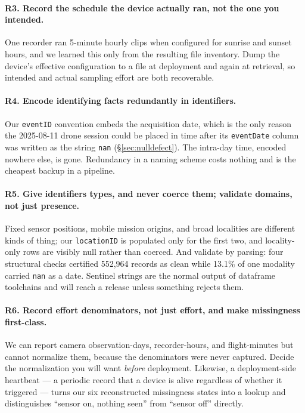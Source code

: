\documentclass[sigconf]{acmart}
\begin{document}
\paragraph{R3. Record the schedule the device actually ran, not the one
you intended.}
One recorder ran 5-minute hourly clips when configured for sunrise and
sunset hours, and we learned this only from the resulting file
inventory. Dump the device's effective configuration to a file at
deployment and again at retrieval, so intended and actual sampling
effort are both recoverable.

\paragraph{R4. Encode identifying facts redundantly in identifiers.}
Our \texttt{eventID} convention embeds the acquisition date, which is
the only reason the 2025-08-11 drone session could be placed in time
after its \texttt{eventDate} column was written as the string
\texttt{nan} (\S\ref{sec:nulldefect}). The intra-day time, encoded
nowhere else, is gone. Redundancy in a naming scheme costs nothing and
is the cheapest backup in a pipeline.

\paragraph{R5. Give identifiers types, and never coerce them; validate
domains, not just presence.}
Fixed sensor positions, mobile mission origins, and broad localities are
different kinds of thing; our \texttt{locationID} is populated only for
the first two, and locality-only rows are visibly null rather than
coerced. And validate by parsing: four structural checks certified
552{,}964 records as clean while 13.1\% of one modality carried
\texttt{nan} as a date. Sentinel strings are the normal output of
dataframe toolchains and will reach a release unless something rejects
them.

\paragraph{R6. Record effort denominators, not just effort, and make
missingness first-class.}
We can report camera observation-days, recorder-hours, and
flight-minutes but cannot normalize them, because the denominators were
never captured. Decide the normalization you will want \emph{before}
deployment. Likewise, a deployment-side heartbeat --- a periodic record
that a device is alive regardless of whether it triggered --- turns our
six reconstructed missingness states into a lookup and distinguishes
``sensor on, nothing seen'' from ``sensor off'' directly.
\end{document}
